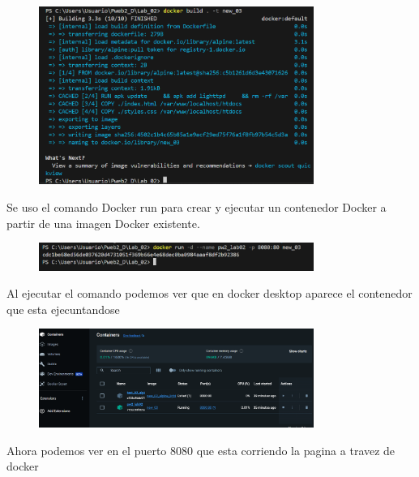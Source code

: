 \documentclass{article}
\begin{document}
     \begin{figure}[H]
		          \centering
		          \includegraphics[width=0.8\textwidth,keepaspectratio]                       {img/Docker_build.png}
    \end{figure}

Se uso el comando Docker run para crear y ejecutar un contenedor Docker a partir de una imagen Docker existente.
    \begin{figure}[H]
		          \centering
		          \includegraphics[width=0.8\textwidth,keepaspectratio]                       {img/Docker_run.png}
    \end{figure}
Al ejecutar el comando podemos ver que en docker desktop aparece el contenedor que esta ejecuntandose
    \begin{figure}[H]
		          \centering
		          \includegraphics[width=0.8\textwidth,keepaspectratio]                       {img/Docker_desktop.png}
    \end{figure}
Ahora podemos ver en el puerto 8080 que esta corriendo la pagina a travez de docker
\end{document}
